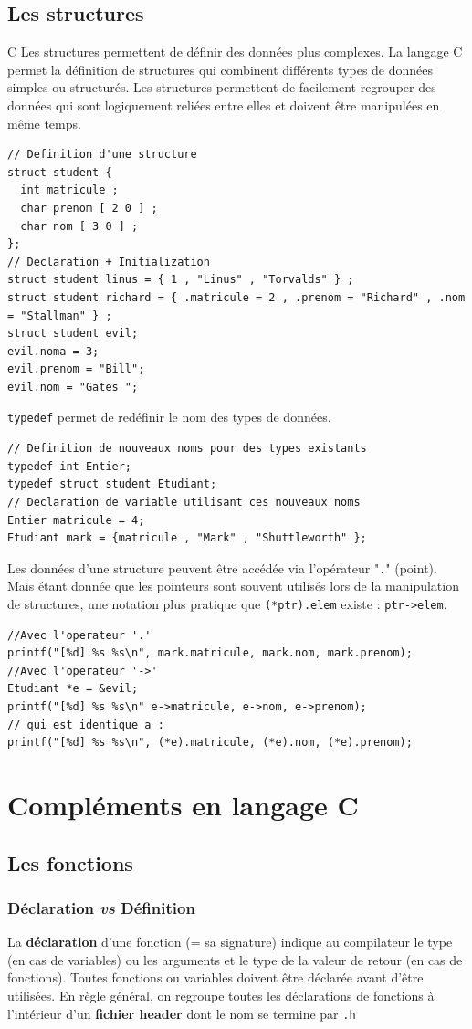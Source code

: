 \subsection{Les structures}
C Les structures permettent de définir des données plus complexes.
La langage C permet la définition de structures qui combinent différents types de données simples ou structurés.
Les structures permettent de facilement regrouper des données qui sont logiquement reliées entre elles et doivent être manipulées en même temps.
\begin{lstlisting}
// Definition d'une structure
struct student {
  int matricule ;
  char prenom [ 2 0 ] ;
  char nom [ 3 0 ] ;
};
// Declaration + Initialization
struct student linus = { 1 , "Linus" , "Torvalds" } ;
struct student richard = { .matricule = 2 , .prenom = "Richard" , .nom = "Stallman" } ;
struct student evil;
evil.noma = 3;
evil.prenom = "Bill";
evil.nom = "Gates ";
\end{lstlisting}


\texttt{typedef} permet de redéfinir le nom des types de données.
\begin{lstlisting}
// Definition de nouveaux noms pour des types existants
typedef int Entier;
typedef struct student Etudiant;
// Declaration de variable utilisant ces nouveaux noms
Entier matricule = 4;
Etudiant mark = {matricule , "Mark" , "Shuttleworth" };
\end{lstlisting}
Les données d'une structure peuvent être accédée via l'opérateur "\texttt{.}" (point).
Mais étant donnée que les pointeurs sont souvent utilisés lors de la manipulation de structures, une notation plus pratique que \texttt{(*ptr).elem} existe : \texttt{ptr->elem}.
\begin{lstlisting}
//Avec l'operateur '.'
printf("[%d] %s %s\n", mark.matricule, mark.nom, mark.prenom);
//Avec l'operateur '->'
Etudiant *e = &evil;
printf("[%d] %s %s\n" e->matricule, e->nom, e->prenom);
// qui est identique a :
printf("[%d] %s %s\n", (*e).matricule, (*e).nom, (*e).prenom);
\end{lstlisting}

\section{Compléments en langage C}
\subsection{Les fonctions}
\subsubsection{Déclaration \textit{vs} Définition}
La \textbf{déclaration} d'une fonction (= sa signature) indique au compilateur le type (en cas de variables) ou les arguments et le type de la valeur de retour (en cas de fonctions).
Toutes fonctions ou variables doivent être déclarée avant d'être utilisées.
En règle général, on regroupe toutes les déclarations de fonctions à l'intérieur d'un \textbf{fichier header} dont le nom se termine par \texttt{.h}


